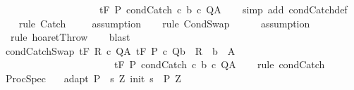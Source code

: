 \begin{isabellebody}
\ \ \ \ \ \ \ \ \ \ \ \ \ \ \ \ \ \ {\isasymLongrightarrow}\ \ {\isasymGamma}{\isacharcomma}{\isasymTheta}{\isasymturnstile}\isactrlsub t\isactrlbsub {\isacharslash}F\isactrlesub \ P\ condCatch\ c\ b\ c\ Q{\isacharcomma}A{\isachardoublequoteclose}\isanewline
%
\isadelimproof
\ \ %
\endisadelimproof
%
\isatagproof
{}\isamarkupfalse%
\ {\isacharparenleft}simp\ add{\isacharcolon}\ condCatch{\isacharunderscore}def{\isacharparenright}\isanewline
\ \ \isamarkupfalse%
\ {\isacharparenleft}rule\ Catch{\isacharparenright}\isanewline
\ \ \isamarkupfalse%
\ \ assumption\isanewline
\ \ \isamarkupfalse%
\ {\isacharparenleft}rule\ CondSwap{\isacharparenright}\isanewline
\ \ \isamarkupfalse%
\ \ \ {\isacharparenleft}assumption{\isacharparenright}\isanewline
\ \ \isamarkupfalse%
\ \ {\isacharparenleft}rule\ hoaret{\isachardot}Throw{\isacharparenright}\isanewline
\ \ \isamarkupfalse%
\ blast\isanewline
\ \ \isamarkupfalse%
%
\endisatagproof
{\isafoldproof}%
%
\isadelimproof
\isanewline
%
\endisadelimproof
\isanewline
{}\isamarkupfalse%
\ condCatchSwap{\isacharcolon}\ {\isachardoublequoteopen}{\isasymlbrakk}{\isasymGamma}{\isacharcomma}{\isasymTheta}{\isasymturnstile}\isactrlsub t\isactrlbsub {\isacharslash}F\isactrlesub \ R\ c\ Q{\isacharcomma}A{\isacharsemicolon}\ {\isasymGamma}{\isacharcomma}{\isasymTheta}{\isasymturnstile}\isactrlsub t\isactrlbsub {\isacharslash}F\isactrlesub \ P\ c\ Q{\isacharcomma}{\isacharparenleft}{\isacharparenleft}b\ {\isasyminter}\ R{\isacharparenright}\ {\isasymunion}\ {\isacharparenleft}{\isacharminus}b\ {\isasyminter}\ A{\isacharparenright}{\isacharparenright}{\isasymrbrakk}\ \isanewline
\ \ \ \ \ \ \ \ \ \ \ \ \ \ \ \ \ \ \ \ \ {\isasymLongrightarrow}\ \ {\isasymGamma}{\isacharcomma}{\isasymTheta}{\isasymturnstile}\isactrlsub t\isactrlbsub {\isacharslash}F\isactrlesub \ P\ condCatch\ c\ b\ c\ Q{\isacharcomma}A{\isachardoublequoteclose}\isanewline
%
\isadelimproof
\ \ %
\endisadelimproof
%
\isatagproof
{}\isamarkupfalse%
\ {\isacharparenleft}rule\ condCatch{\isacharparenright}%
\endisatagproof
{\isafoldproof}%
%
\isadelimproof
\isanewline
%
\endisadelimproof
\isanewline
\isanewline
{}\isamarkupfalse%
\ ProcSpec{\isacharcolon}\isanewline
\ \ \ adapt{\isacharcolon}\ {\isachardoublequoteopen}P\ {\isasymsubseteq}\ {\isacharbraceleft}s{\isachardot}\ {\isasymexists}Z{\isachardot}\ init\ s\ {\isasymin}\ P{\isacharprime}\ Z\ {\isasymand}\ \isanewline

\end{isabellebody}
